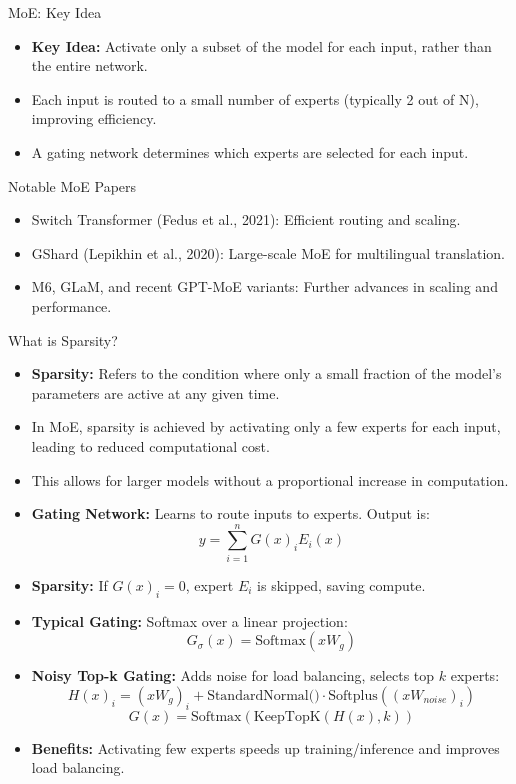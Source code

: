 \begin{frame}{MoE: Key Idea}
    \begin{itemize}
        \item \textbf{Key Idea:} Activate only a subset of the model for each input, rather than the entire network.
        \item Each input is routed to a small number of experts (typically 2 out of N), improving efficiency.
        \item A gating network determines which experts are selected for each input.
    \end{itemize}
\end{frame}

\begin{frame}{Notable MoE Papers}
    \begin{itemize}
        \item Switch Transformer (Fedus et al., 2021): Efficient routing and scaling.
        \item GShard (Lepikhin et al., 2020): Large-scale MoE for multilingual translation.
        \item M6, GLaM, and recent GPT-MoE variants: Further advances in scaling and performance.
    \end{itemize}
\end{frame}

\begin{frame}[allowframebreaks]{What is Sparsity?}
    \begin{itemize}
        \item \textbf{Sparsity:} Refers to the condition where only a small fraction of the model's parameters are active at any given time.
        \item In MoE, sparsity is achieved by activating only a few experts for each input, leading to reduced computational cost.
        \item This allows for larger models without a proportional increase in computation.
    \end{itemize}

\framebreak

    \begin{itemize}
        \item \textbf{Gating Network:} Learns to route inputs to experts. Output is:
        \[
            y = \sum_{i=1}^{n} G(x)_i E_i(x)
        \]
        \item \textbf{Sparsity:} If $G(x)_i = 0$, expert $E_i$ is skipped, saving compute.
        \item \textbf{Typical Gating:} Softmax over a linear projection:
        \[
            G_\sigma(x) = \text{Softmax}(x W_g)
        \]
        \item \textbf{Noisy Top-k Gating:} Adds noise for load balancing, selects top $k$ experts:
        \[
            H(x)_i = (x W_g)_i + \text{StandardNormal()} \cdot \text{Softplus}((x W_{noise})_i)
        \]
        \[
            G(x) = \text{Softmax}(\text{KeepTopK}(H(x), k))
        \]
        \item \textbf{Benefits:} Activating few experts speeds up training/inference and improves load balancing.
    \end{itemize}
\end{frame}

